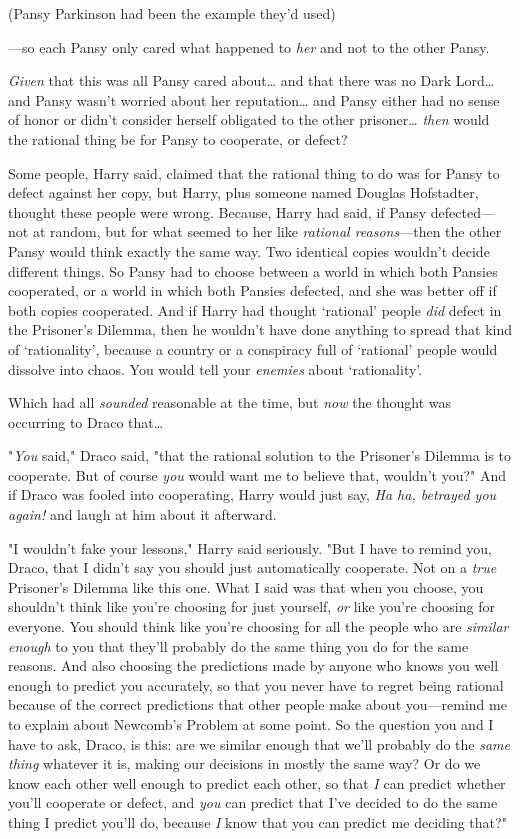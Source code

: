(Pansy Parkinson had been the example they'd used)

---so each Pansy only cared what happened to \emph{her} and not to the other
Pansy.

\emph{Given} that this was all Pansy cared about{\ldots} and that there was no
Dark Lord{\ldots} and Pansy wasn't worried about her reputation{\ldots} and
Pansy either had no sense of honor or didn't consider herself obligated to the
other prisoner{\ldots} \emph{then} would the rational thing be for Pansy to
cooperate, or defect?

Some people, Harry said, claimed that the rational thing to do was for Pansy to
defect against her copy, but Harry, plus someone named Douglas Hofstadter,
thought these people were wrong. Because, Harry had said, if Pansy
defected---not at random, but for what seemed to her like \emph{rational
reasons}---then the other Pansy would think exactly the same way. Two identical
copies wouldn't decide different things. So Pansy had to choose between a world
in which both Pansies cooperated, or a world in which both Pansies defected,
and she was better off if both copies cooperated. And if Harry had thought
`rational' people \emph{did} defect in the Prisoner's Dilemma, then he wouldn't
have done anything to spread that kind of `rationality', because a country or a
conspiracy full of `rational' people would dissolve into chaos. You would tell
your \emph{enemies} about `rationality'.

Which had all \emph{sounded} reasonable at the time, but \emph{now} the thought
was occurring to Draco that{\ldots}

"\emph{You} said," Draco said, "that the rational solution to the Prisoner's
Dilemma is to cooperate. But of course \emph{you} would want me to believe
that, wouldn't you?" And if Draco was fooled into cooperating, Harry would just
say, \emph{Ha ha, betrayed you again!} and laugh at him about it afterward.

"I wouldn't fake your lessons," Harry said seriously. "But I have to remind
you, Draco, that I didn't say you should just automatically cooperate. Not on a
\emph{true} Prisoner's Dilemma like this one. What I said was that when you
choose, you shouldn't think like you're choosing for just yourself, \emph{or}
like you're choosing for everyone. You should think like you're choosing for
all the people who are \emph{similar enough} to you that they'll probably do
the same thing you do for the same reasons. And also choosing the predictions
made by anyone who knows you well enough to predict you accurately, so that you
never have to regret being rational because of the correct predictions that
other people make about you---remind me to explain about Newcomb's Problem at
some point. So the question you and I have to ask, Draco, is this: are we
similar enough that we'll probably do the \emph{same thing} whatever it is,
making our decisions in mostly the same way? Or do we know each other well
enough to predict each other, so that \emph{I} can predict whether you'll
cooperate or defect, and \emph{you} can predict that I've decided to do the
same thing I predict you'll do, because \emph{I} know that you can predict me
deciding that?"

